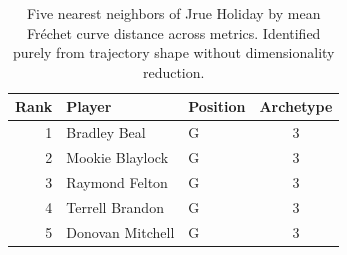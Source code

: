 \begin{table}[htbp]
  \centering\small
  \begin{tabular}{rllc}
    \toprule
    Rank & Player & Position & Archetype \\
    \midrule
    1 & Bradley Beal & G & 3 \\
    2 & Mookie Blaylock & G & 3 \\
    3 & Raymond Felton & G & 3 \\
    4 & Terrell Brandon & G & 3 \\
    5 & Donovan Mitchell & G & 3 \\
    \bottomrule
  \end{tabular}
  \caption{Five nearest neighbors of Jrue Holiday by mean Fr\'{e}chet curve distance across metrics. Identified purely from trajectory shape without dimensionality reduction.}
  \label{tab:Jrue_Holiday_frechet_curve_neighbors}
\end{table}

